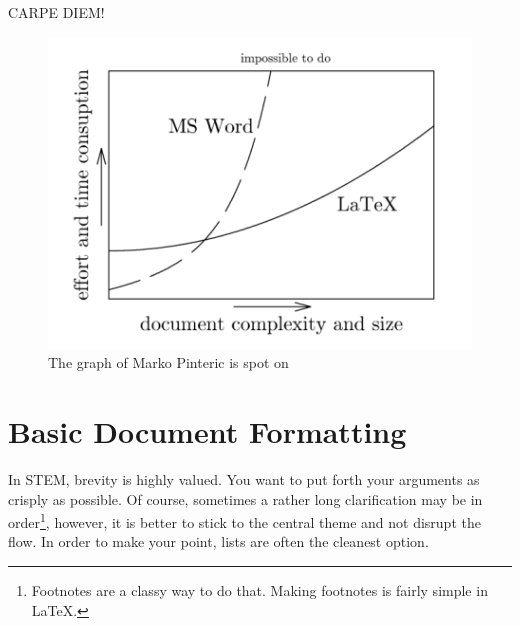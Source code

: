 \documentclass[a4paper]{article}
\newcommand{\latex}{\LaTeX\xspace}
\begin{document}
\begin{flushright}
\textcolor{Sepia}{{\LARGE C}{\large ARPE} {\LARGE D}{\large IEM!}}
\end{flushright}
\begin{figure}[H]
\centering
\includegraphics[scale=0.5]{ease-graph.png}
\caption{The graph of Marko Pinteric is spot on}
\end{figure}
\section{Basic Document Formatting}
In STEM, brevity is highly valued. You want to put forth your arguments as crisply as possible. Of course, sometimes a rather long clarification may be in order\renewcommand*{\thefootnote}{\arabic{footnote}}\footnote{Footnotes are a classy way to do that. Making footnotes is fairly simple in \latex.}, however, it is better to stick to the central theme and not disrupt the flow. In order to make your point, lists are often the cleanest option.\par
\end{document}
